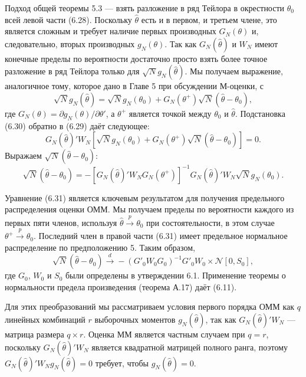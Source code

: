 Подход общей теоремы 5.3 --- взять разложение в ряд Тейлора в окрестности $\theta_0$ всей левой части (6.28). Поскольку $\hat{\theta}$ есть и в первом, и третьем члене, это является сложным и требует наличие первых производных $G_N(\theta)$ и, следовательно, вторых производных $g_N(\theta)$. Так как $G_N(\hat{\theta})$ и $W_N$  имеют конечные пределы по вероятности достаточно просто взять более точное разложение в ряд Тейлора только для $\sqrt{N} g_N(\hat{\theta})$. Мы получаем выражение, аналогичное тому, которое дано в Главе 5 при обсуждении М-оценки, с
\begin{equation}
\sqrt{N} g_N(\hat{\theta})= \sqrt{N} g_N(\theta_0)+G_N(\theta^+) \sqrt{N} (\hat{\theta}-\theta_0),
\end{equation}
где $G_N(\theta)=\partial g_N(\theta) / \partial \theta'$, а $\theta^+$ является точкой между $\theta_0$ и $\hat{\theta}$. Подстановка (6.30) обратно в (6.29) даёт следующее:
\[
G_N(\hat{\theta})' W_N \left[ \sqrt{N} g_N(\theta_0)+G_N(\theta^+) \sqrt{N} (\hat{\theta}-\theta_0) \right]=0.
\]
Выражаем $\sqrt{N} (\hat{\theta}-\theta_0)$:
\begin{equation}
\sqrt{N} (\hat{\theta}-\theta_0)=- \left[ G_N(\hat{\theta})' W_N G_N(\theta^+) \right] ^{-1} G_N(\hat{\theta})' W_N \sqrt{N} g_N(\theta_0).
\end{equation}

Уравнение (6.31) является ключевым результатом для получения предельного распределения оценки ОММ. Мы получаем пределы по вероятности каждого из первых пяти членов, используя $\hat{\theta} \xrightarrow{p} \theta_0$ при состоятельности, в этом случае $\theta^+ \xrightarrow{p} \theta_0$. Последний член в правой части (6.31) имеет предельное нормальное распределение по предположению 5. Таким образом,
\[
\sqrt{N} (\hat{\theta}-\theta_0) \xrightarrow{d} -(G'_0 W_0 G_0)^{-1} G'_0 W_0 \times \mathcal{N}[0,S_0],
\]
где $G_0$, $W_0$ и $S_0$ были определены в утверждении 6.1. Применение теоремы о нормальности предела  произведения (теорема А.17) даёт (6.11).

Для этих преобразований мы  рассматриваем условия первого порядка ОММ как $q$ линейных комбинаций $r$ выборочных моментов $g_N(\hat{\theta})$, так как $G_N(\hat{\theta})' W_N$ --- матрица размера $q \times r$. Оценка ММ является частным случаем при $q=r$, поскольку $G_N(\hat{\theta})' W_N$ является квадратной матрицей полного ранга, поэтому $G_N(\hat{\theta})' W_N g_N(\hat{\theta})=0$ требует, чтобы $g_N(\hat{\theta})=0$.

